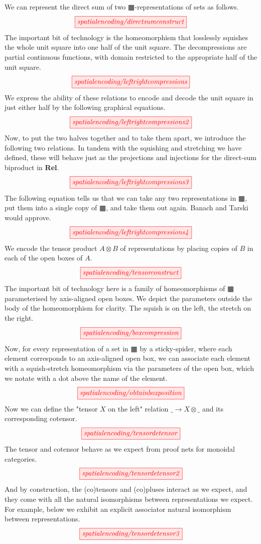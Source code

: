 \begin{construction}
We can represent the direct sum of two $\squarehvfill$-representations of sets as follows.
\[\scalebox{1}{\tikzfig{spatialencoding/directsumconstruct}}\]
The important bit of technology is the homeomorphism that losslessly squishes the whole unit square into one half of the unit square. The decompressions are partial continuous functions, with domain restricted to the appropriate half of the unit square.
\[\scalebox{1}{\tikzfig{spatialencoding/leftrightcompressions}}\]
We express the ability of these relations to encode and decode the unit square in just either half by the following graphical equations.
\[\scalebox{1}{\tikzfig{spatialencoding/leftrightcompressions2}}\]
Now, to put the two halves together and to take them apart, we introduce the following two relations. In tandem with the squishing and stretching we have defined, these will behave just as the projections and injections for the direct-sum biproduct in \textbf{Rel}.
\[\scalebox{1}{\tikzfig{spatialencoding/leftrightcompressions3}}\]
The following equation tells us that we can take any two representations in $\squarehvfill$, put them into a single copy of $\squarehvfill$, and take them out again. Banach and Tarski would approve.
\[\scalebox{1}{\tikzfig{spatialencoding/leftrightcompressions4}}\]
We encode the tensor product $A \otimes B$ of representations by placing copies of $B$ in each of the open boxes of $A$.
\[\scalebox{1}{\tikzfig{spatialencoding/tensorconstruct}}\]
The important bit of technology here is a family of homeomorphisms of $\squarehvfill$ parameterised by axis-aligned open boxes. We depict the parameters outside the body of the homeomorphism for clarity. The squish is on the left, the stretch on the right.
\[\scalebox{1}{\tikzfig{spatialencoding/boxcompression}}\]
Now, for every representation of a set in $\squarehvfill$ by a sticky-spider, where each element corresponds to an axis-aligned open box, we can associate each element with a squish-stretch homeomorphism via the parameters of the open box, which we notate with a dot above the name of the element.
\[\scalebox{1}{\tikzfig{spatialencoding/obtainboxposition}}\]
Now we can define the "tensor $X$ on the left" relation $\_ \rightarrow X \otimes \_$ and its corresponding cotensor.
\[\scalebox{1}{\tikzfig{spatialencoding/tensordetensor}}\]
The tensor and cotensor behave as we expect from proof nets for monoidal categories.
\[\scalebox{1}{\tikzfig{spatialencoding/tensordetensor2}}\]
And by construction, the (co)tensors and (co)pluses interact as we expect, and they come with all the natural isomorphisms between representations we expect. For example, below we exhibit an explicit associator natural isomorphism between representations.
\[\scalebox{1}{\tikzfig{spatialencoding/tensordetensor3}}\]
\end{construction}

